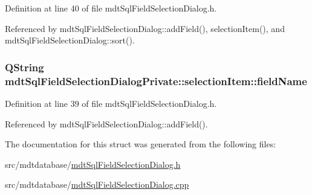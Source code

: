 Definition at line 40 of file mdt\-Sql\-Field\-Selection\-Dialog.\-h.



Referenced by mdt\-Sql\-Field\-Selection\-Dialog\-::add\-Field(), selection\-Item(), and mdt\-Sql\-Field\-Selection\-Dialog\-::sort().

\hypertarget{structmdt_sql_field_selection_dialog_private_1_1selection_item_a77cd7117a117e9eb7124fbd57267ba56}{
\subsubsection[{field\-Name}]{\setlength{\rightskip}{0pt plus 5cm}Q\-String mdt\-Sql\-Field\-Selection\-Dialog\-Private\-::selection\-Item\-::field\-Name}}\label{structmdt_sql_field_selection_dialog_private_1_1selection_item_a77cd7117a117e9eb7124fbd57267ba56}


Definition at line 39 of file mdt\-Sql\-Field\-Selection\-Dialog.\-h.



Referenced by mdt\-Sql\-Field\-Selection\-Dialog\-::add\-Field().



The documentation for this struct was generated from the following files\-:\begin{DoxyCompactItemize}
\item 
src/mdtdatabase/\hyperlink{mdt_sql_field_selection_dialog_8h}{mdt\-Sql\-Field\-Selection\-Dialog.\-h}\item 
src/mdtdatabase/\hyperlink{mdt_sql_field_selection_dialog_8cpp}{mdt\-Sql\-Field\-Selection\-Dialog.\-cpp}\end{DoxyCompactItemize}
